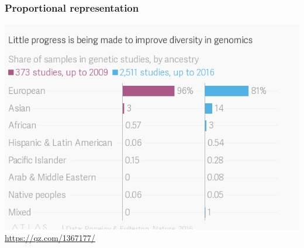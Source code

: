 \begin{frame}
  \frametitle{Proportional representation}
  \includegraphics[width=\textwidth]{../figures/genomics-diversity}
  \url{https://qz.com/1367177/}
\end{frame}



